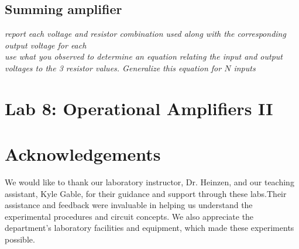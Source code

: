 \documentclass{article}
\begin{document}
\subsection{Summing amplifier}

\textit{report each voltage and resistor combination used along with the corresponding output voltage for each}\\

\noindent\textit{use what you observed to determine an equation relating the input and output voltages to the 3 resistor values. Generalize this equation for $N$ inputs}




\section{Lab 8: Operational Amplifiers II}



\section*{Acknowledgements}

We would like to thank our laboratory instructor, Dr. Heinzen, and our teaching 
assistant, Kyle Gable, for their guidance and support through these labs.Their 
assistance and feedback were invaluable in helping us understand the experimental 
procedures and circuit concepts. We also appreciate the department's laboratory 
facilities and equipment, which made these experiments possible.
\end{document}
